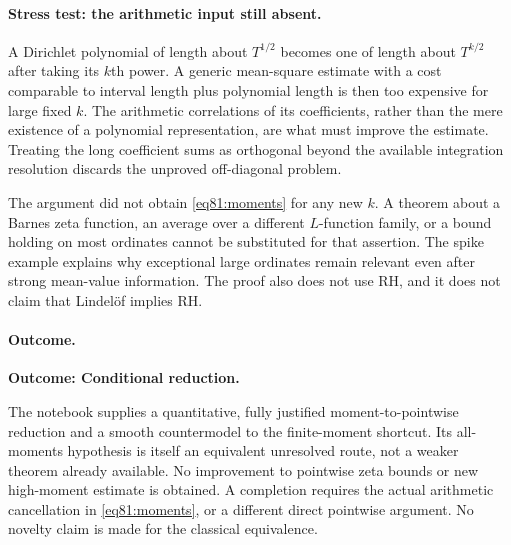 \documentclass[11pt,a4paper]{article}
\numberwithin{equation}{section}
\begin{document}
\paragraph{Stress test: the arithmetic input still absent.}
A Dirichlet polynomial of length about $T^{1/2}$ becomes one of length
about $T^{k/2}$ after taking its $k$th power. A generic mean-square estimate
with a cost comparable to interval length plus polynomial length is then
too expensive for large fixed $k$. The arithmetic correlations of its
coefficients, rather than the mere existence of a polynomial representation,
are what must improve the estimate. Treating the long coefficient sums
as orthogonal beyond the available integration resolution discards the
unproved off-diagonal problem.

The argument did not obtain \eqref{eq81:moments} for any new $k$. A theorem
about a Barnes zeta function, an average over a different $L$-function
family, or a bound holding on most ordinates cannot be substituted for
that assertion. The spike example explains why exceptional large ordinates
remain relevant even after strong mean-value information. The proof also
does not use RH, and it does not claim that Lindel\"of implies RH.

\paragraph{Outcome.}
\textbf{Outcome: Conditional reduction.}

The notebook supplies a quantitative, fully justified moment-to-pointwise
reduction and a smooth countermodel to the finite-moment shortcut. Its
all-moments hypothesis is itself an equivalent unresolved route, not a
weaker theorem already available. No improvement to pointwise zeta bounds
or new high-moment estimate is obtained. A completion requires the actual
arithmetic cancellation in \eqref{eq81:moments}, or a different direct
pointwise argument. No novelty claim is made for the classical equivalence.

\needspace{170mm}
\end{document}
